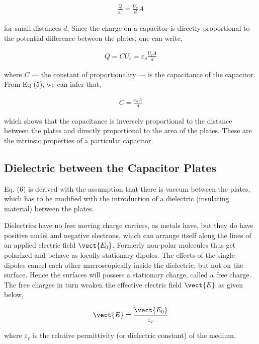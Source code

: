 \begin{align}
    \frac{Q}{\varepsilon_o} = \frac{U_c}{d}A
\end{align}

for small distances $d$.
Since the charge on a capacitor is directly proportional to the potential difference between the plates, one can write,

\begin{align}
    Q = CU_c = \varepsilon_o\frac{U_cA}{d}
\end{align}

where $C$ --- the constant of proportionality --- is the capacitance of the capacitor. From Eq (5), we can infer that,

\begin{align}
    C = \frac{\varepsilon_oA}{d}
\end{align}

which shows that the capacitance is inversely proportional to the distance between the plates and directly proportional to the area of the plates. These are the intrinsic properties of a particular capacitor.

\subsection*{Dielectric between the Capacitor Plates}

Eq. (6) is derived with the assumption that there is vaccum between the plates, which has to be modified with the introduction of a dielectric (insulating material) between the plates. 

Dielectrics have no free moving charge carriers, as metals have, but they do have positive nuclei and negative electrons, which can arrange itself along the lines of an applied electric field $\vect{E_0}$. Formerly non-polar molecules thus get polarized and behave as locally stationary dipoles. The effects of the single dipoles cancel each other macroscopically inside the dielectric, but not on the surface. Hence the surfaces will possess a stationary charge, called a free charge. The free  charges in turn weaken the effective electric field $\vect{E}$ as given below,

\begin{align}
    \vect{E} =\frac{\vect{E_0}}{\varepsilon_r}
\end{align}

where $\varepsilon_r$ is the relative permittivity (or dielectric constant) of the medium. 

